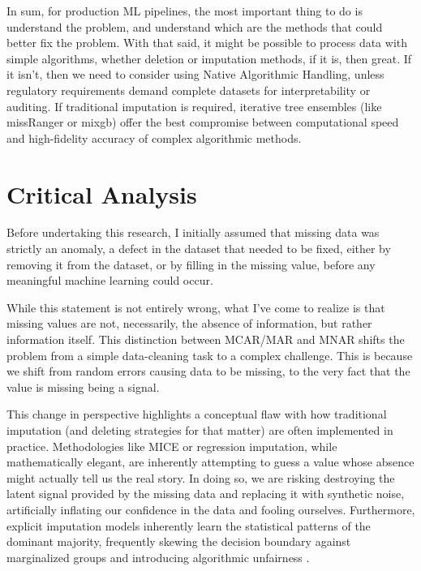 \documentclass[journal]{IEEEtran}
\begin{document}
In sum, for production ML pipelines, the most important thing to do is understand the problem, and understand which are the methods that could better fix the problem. With that said, it might be possible to process data with simple algorithms, whether deletion or imputation methods, if it is, then great. If it isn't, then we need to consider using Native Algorithmic Handling, unless regulatory requirements demand complete datasets for interpretability or auditing. If traditional imputation is required, iterative tree ensembles (like missRanger or mixgb) offer the best compromise between computational speed and high-fidelity accuracy of complex algorithmic methods.

\section{Critical Analysis}
Before undertaking this research, I initially assumed that missing data was strictly an anomaly, a defect in the dataset that needed to be fixed, either by removing it from the dataset, or by filling in the missing value, before any meaningful machine learning could occur.

While this statement is not entirely wrong, what I've come to realize is that missing values are not, necessarily, the absence of information, but rather information itself. This distinction between MCAR/MAR and MNAR shifts the problem from a simple data-cleaning task to a complex challenge. This is because we shift from random errors causing data to be missing, to the very fact that the value is missing being a signal.

This change in perspective highlights a conceptual flaw with how traditional imputation (and deleting strategies for that matter) are often implemented in practice. Methodologies like MICE or regression imputation, while mathematically elegant, are inherently attempting to guess a value whose absence might actually tell us the real story. In doing so, we are risking destroying the latent signal provided by the missing data and replacing it with synthetic noise, artificially inflating our confidence in the data and fooling ourselves. Furthermore, explicit imputation models inherently learn the statistical patterns of the dominant majority, frequently skewing the decision boundary against marginalized groups and introducing algorithmic unfairness \cite{caton2022impact}.
\end{document}
